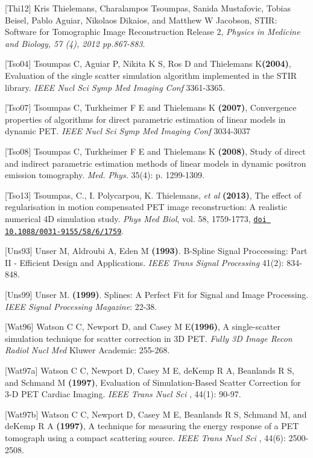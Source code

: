 \documentclass{article}
\def\url#1#2{\mbox{\href{#1}{\tt #2}}}
\begin{document}
{{{{{{{[}Thi12] Kris Thielemans, Charalampos Tsoumpas, Sanida Mustafovic, Tobias Beisel, Pablo Aguiar, Nikolaos Dikaios, and Matthew W Jacobson,
STIR: Software for Tomographic Image Reconstruction Release 2,
\textit{Physics in Medicine and Biology, 57 (4), 2012 pp.867-883}.

{[}Tso04{]} Tsoumpas C, Aguiar P, Nikita K S, Ros D and Thielemans K\textbf{(2004)}, 
Evaluation of the single scatter simulation algorithm implemented in the STIR library. 
\textit { IEEE Nucl Sci Symp Med Imaging Conf } 3361-3365.

{[}Tso07{]} Tsoumpas C, Turkheimer F E and Thielemans K  \textbf{(2007)}, 
Convergence properties of algorithms for direct parametric estimation of linear models in dynamic PET. 
\textit{IEEE Nucl Sci Symp Med Imaging Conf} 3034-3037

{[}Tso08{]} Tsoumpas C, Turkheimer F E and Thielemans K \textbf{(2008)}, Study of direct and indirect 
parametric estimation methods of linear models in dynamic positron emission tomography. \textit{Med. Phys.} 
35(4): p. 1299-1309.

[Tso13] Tsoumpas, C., I.
Polycarpou, K. Thielemans, \textit{et al} \textbf{(2013)}, The effect of
regularisation in motion compensated PET image reconstruction: A realistic
numerical 4D simulation study. \textit{Phys Med Biol}, vol. 58, 1759-1773, 
\url{http://dx.doi.org/10.1088/0031-9155/58/6/1759}{doi 10.1088/0031-9155/58/6/1759}.


{[}Uns93] Unser M, Aldroubi A, Eden M \textbf{(1993)}. B-Spline Signal Proccessing: Part II - Efficient Design and Applications.  \textit{IEEE Trans Signal Processing} 41(2): 834-848.

{[}Uns99] Unser M. \textbf{(1999)}. Splines: A Perfect Fit for Signal and Image Processing. \textit{IEEE Signal Processing Magazine}: 22-38.

{[}Wat96{]} Watson C C, Newport D, and Casey M E\textbf{(1996)}, 
A single-scatter simulation technique for scatter correction in 3D PET. 
\textit { Fully 3D Image Recon Radiol Nucl Med} Kluwer Academic: 255-268. 

{[}Wat97a{]} Watson C C, Newport D, Casey M E, deKemp R A, Beanlands R S, and Schmand M 
\textbf{(1997)}, Evaluation of Simulation-Based Scatter Correction for 3-D PET Cardiac Imaging. 
\textit { IEEE Trans Nucl Sci }, 44(1): 90-97.

{[}Wat97b{]} Watson C C, Newport D, Casey M E, Beanlands R S, Schmand M, and deKemp R A 
\textbf{(1997)}, A technique for measuring the energy response of a PET tomograph using a compact scattering source. 
\textit { IEEE Trans Nucl Sci }, 44(6): 2500-2508.

}}}}}}
\end{document}
